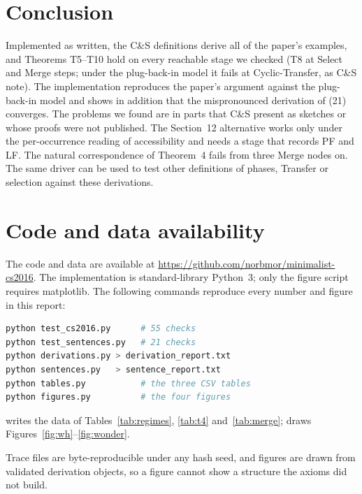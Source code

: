 \documentclass[11pt]{article}
\newcommand{\code}[1]{\texttt{\detokenize{#1}}}
\newcommand{\Thm}[1]{T#1}
\theoremstyle{definition}
\theoremstyle{plain}
\begin{document}
\section{Conclusion}
\label{sec:conclusion}

Implemented as written, the C\&S definitions derive all of the paper's
examples, and Theorems \Thm{5}--\Thm{10} hold on every reachable stage we
checked (\Thm{8} at Select and Merge steps; under the plug-back-in model it
fails at Cyclic-Transfer, as C\&S note). The implementation reproduces the paper's argument against the
plug-back-in model and shows in addition that the mispronounced derivation
of (21) converges. The problems we found are in parts that C\&S present as
sketches or whose proofs were not published. The Section~12 alternative
works only under the per-occurrence reading of accessibility and needs a
stage that records PF and LF. The natural correspondence of Theorem~4 fails
from three Merge nodes on. The same driver can be used to test other
definitions of phases, Transfer or selection against these derivations.

\section*{Code and data availability}

The code and data are available at
\url{https://github.com/norbmor/minimalist-cs2016}. The implementation is
standard-library Python~3; only the figure script requires matplotlib. The
following commands reproduce every number and figure in this report:

\begin{lstlisting}[language=bash]
python test_cs2016.py      # 55 checks
python test_sentences.py   # 21 checks
python derivations.py > derivation_report.txt
python sentences.py   > sentence_report.txt
python tables.py           # the three CSV tables
python figures.py          # the four figures
\end{lstlisting}

\noindent
\code{tables.py} writes the data of Tables~\ref{tab:regimes},
\ref{tab:t4} and~\ref{tab:merge}; \code{figures.py} draws
Figures~\ref{fig:wh}--\ref{fig:wonder}.

\noindent
Trace files are byte-reproducible under any hash seed, and figures are drawn
from validated derivation objects, so a figure cannot show a structure the
axioms did not build.
\end{document}
